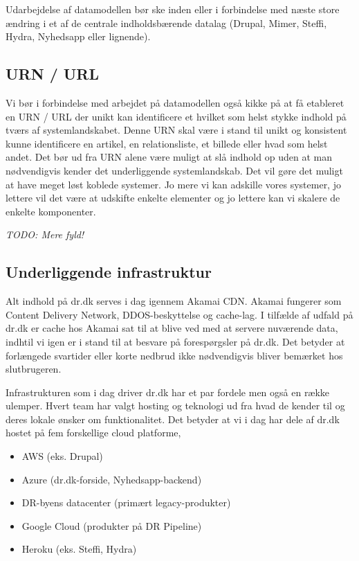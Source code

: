 \documentclass{article}
\begin{document}
Udarbejdelse af datamodellen bør ske inden eller i forbindelse med næste store ændring i et af de centrale indholdsbærende datalag (Drupal, Mimer, Steffi, Hydra, Nyhedsapp eller lignende).


\subsection{URN / URL}
Vi bør i forbindelse med arbejdet på datamodellen også kikke på at få etableret en URN / URL der unikt kan identificere et hvilket som helst stykke indhold på tværs af systemlandskabet. Denne URN skal være i stand til unikt og konsistent kunne identificere en artikel, en relationsliste, et billede eller hvad som helst andet. Det bør ud fra URN alene være muligt at slå indhold op uden at man nødvendigvis kender det underliggende systemlandskab. Det vil gøre det muligt at have meget løst koblede systemer.
Jo mere vi kan adskille vores systemer, jo lettere vil det være at udskifte enkelte elementer og jo lettere kan vi skalere de enkelte komponenter. 



    \textit{TODO: Mere fyld!}

\subsection{Underliggende infrastruktur}
Alt indhold på dr.dk serves i dag igennem Akamai CDN. Akamai fungerer som Content Delivery Network, DDOS-beskyttelse og cache-lag. I tilfælde af udfald på dr.dk er cache hos Akamai sat
til at blive ved med at servere nuværende data, indhtil vi igen er i stand til at besvare på forespørgsler på dr.dk. Det betyder at forlængede svartider eller korte nedbrud ikke nødvendigvis bliver bemærket hos slutbrugeren.

Infrastrukturen som i dag driver dr.dk har et par fordele men også en række ulemper. Hvert team har valgt hosting og teknologi ud fra hvad de kender til og deres lokale ønsker om funktionalitet. Det betyder at vi i dag har dele af dr.dk hostet på fem forskellige cloud platforme,

\begin{itemize}
    \item AWS (eks. Drupal)
    \item Azure (dr.dk-forside, Nyhedsapp-backend)
    \item DR-byens datacenter (primært legacy-produkter)
    \item Google Cloud (produkter på DR Pipeline)
    \item Heroku (eks. Steffi, Hydra)
\end{itemize}
\end{document}

